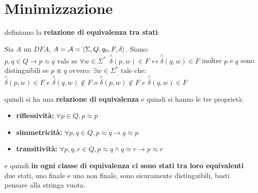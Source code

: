 \section{Minimizzazione}
definiamo la \textbf{relazione di equivalenza tra stati}:
\begin{definition}
	Sia $A$ un $DFA$, $A=\mathcal{A}=\langle \Sigma, Q, q_{0}, F, \delta \rangle$. Siano:
	$p,q\in Q\to p\approx q\text{ vale se } \forall w \in \Sigma^*\,\,\, \stackrel{\wedge}{\delta}(p,w)\in F\longleftrightarrow \stackrel{\wedge}{\delta}(q,w)\in F$
	inoltre $p$ e $q$ sono distinguibili se $p\not\approx q$ ovvero:
	$\exists w\in \Sigma^*\text{ tale che:} $
	$\stackrel{\wedge}{\delta}(p,w)\in F \,\,e\,\,\stackrel{\wedge}{\delta}(q,w)\not\in F\,\,o\,\,\stackrel{\wedge}{\delta}(p,w)\not\in F \,\,e\,\,\stackrel{\wedge}{\delta}(q,w)\in F$
\end{definition}
quindi si ha una \textbf{relazione di equivalenza} e quindi si hanno le tre proprietà:
\begin{itemize}
	\item \textbf{riflessività:} $\forall p\in Q, p\approx p$
	\item \textbf{simmetricità:} $\forall p,q\in Q, p\approx q\to q\approx p$
	\item \textbf{transitività:} $\forall p,q,r\in Q, p\approx q\wedge q\approx r\to p\approx r$
\end{itemize}
e quindi \textbf{in ogni classe di equivalenza ci sono stati tra loro equivalenti}
due stati, uno finale e uno non finale, sono sicuramente distinguibili, basti pensare alla stringa vuota.
